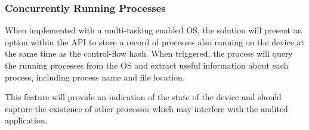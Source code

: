 \subsubsection*{Concurrently Running Processes}

When implemented with a multi-tasking enabled OS, the solution will present an option within the API to store a record of processes also running on the device  at the same time as the control-flow hash. When triggered, the process will query the running processes from the OS and extract useful information about each process, including process name and file location.

This feature will provide an indication of the state of the device and should capture the existence of other processes which may interfere with the audited application. 